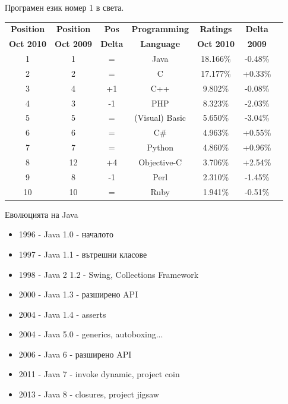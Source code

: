 \documentclass{beamer}
\begin{document}
\begin{frame}{Програмен език номер 1 в света.}
  \transdissolve
  \begin{tabular}{|c|c|c|c|c|c|c|}
    \hline
    \textbf{Position} &
    \textbf{Position} & \textbf{Pos} & \textbf{Programming} &
    \textbf{Ratings} & \textbf{Delta} \\
    \textbf{Oct 2010} &
    \textbf{Oct 2009} & \textbf{Delta} & \textbf{Language} &
    \textbf{Oct 2010} & \textbf{2009} \\ 
    \hline
    \hline
    1 & 1 & = & Java & 18.166\% & -0.48\% \\
    \hline
    2 & 2 & = & C & 17.177\% & +0.33\% \\
    \hline
    3 & 4 & +1 & C++ & 9.802\% & -0.08\% \\
    \hline
    4 & 3 & -1 & PHP & 8.323\% & -2.03\% \\
    \hline
    5 & 5 & = & (Visual) Basic & 5.650\% & -3.04\% \\
    \hline
    6 & 6 & = & C\# & 4.963\% & +0.55\% \\
    \hline
    7 & 7 & = & Python & 4.860\% & +0.96\% \\
    \hline
    8 & 12 & +4 & Objective-C & 3.706\% & +2.54\% \\
    \hline
    9 & 8 & -1 & Perl & 2.310\% & -1.45\% \\
    \hline
    10 & 10 & = & Ruby & 1.941\% & -0.51\% \\
    \hline
  \end{tabular}
\end{frame}

\begin{frame}{Еволюцията на Java}
  \transdissolve
  \begin{itemize}
  \item 1996 - Java 1.0 - началото
  \item 1997 - Java 1.1 - вътрешни класове
  \item 1998 - Java 2 1.2 - Swing, Collections Framework
  \item 2000 - Java 1.3 - разширено API
  \item 2004 - Java 1.4 - asserts
  \item 2004 - Java 5.0 -  generics, autoboxing...
  \item 2006 - Java 6 - разширено API
  \item 2011 - Java 7 - invoke dynamic, project coin
  \item 2013 - Java 8 - closures, project jigsaw
  \end{itemize}
\end{frame}
\end{document}
